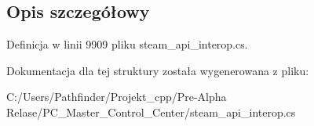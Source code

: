 \subsection{Opis szczegółowy}


Definicja w linii 9909 pliku steam\+\_\+api\+\_\+interop.\+cs.



Dokumentacja dla tej struktury została wygenerowana z pliku\+:\begin{DoxyCompactItemize}
\item 
C\+:/\+Users/\+Pathfinder/\+Projekt\+\_\+cpp/\+Pre-\/\+Alpha Relase/\+P\+C\+\_\+\+Master\+\_\+\+Control\+\_\+\+Center/steam\+\_\+api\+\_\+interop.\+cs\end{DoxyCompactItemize}

